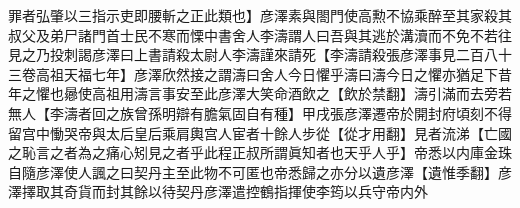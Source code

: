 罪者弘肇以三指示吏即腰斬之正此類也】彦澤素與閤門使高勲不協乘醉至其家殺其叔父及弟尸諸門首士民不寒而慄中書舍人李濤謂人曰吾與其逃於溝瀆而不免不若往見之乃投刺謁彦澤曰上書請殺太尉人李濤謹來請死【李濤請殺張彦澤事見二百八十三卷高祖天福七年】彦澤欣然接之謂濤曰舍人今日懼乎濤曰濤今日之懼亦猶足下昔年之懼也曏使高祖用濤言事安至此彦澤大笑命酒飲之【飲於禁翻】濤引滿而去旁若無人【李濤者回之族曾孫明辯有膽氣固自有種】甲戌張彦澤遷帝於開封府頃刻不得留宫中慟哭帝與太后皇后乘肩輿宫人宦者十餘人步從【從才用翻】見者流涕【亡國之恥言之者為之痛心矧見之者乎此程正叔所謂眞知者也天乎人乎】帝悉以内庫金珠自隨彦澤使人諷之曰契丹主至此物不可匿也帝悉歸之亦分以遺彦澤【遺惟季翻】彦澤擇取其奇貨而封其餘以待契丹彦澤遣控鶴指揮使李筠以兵守帝内外